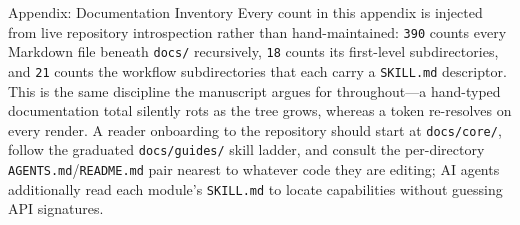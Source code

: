 \documentclass[
  ignorenonframetext,
]{beamer}
\begin{document}
\begin{frame}{Appendix: Documentation
Inventory}
Every count in this appendix is injected from live repository
introspection rather than hand-maintained: \texttt{390} counts every
Markdown file beneath \texttt{docs/} recursively, \texttt{18} counts its
first-level subdirectories, and \texttt{21} counts the workflow
subdirectories that each carry a \texttt{SKILL.md} descriptor. This is
the same discipline the manuscript argues for throughout---a hand-typed
documentation total silently rots as the tree grows, whereas a token
re-resolves on every render. A reader onboarding to the repository
should start at \texttt{docs/core/}, follow the graduated
\texttt{docs/guides/} skill ladder, and consult the per-directory
\texttt{AGENTS.md}/\texttt{README.md} pair nearest to whatever code they
are editing; AI agents additionally read each module's \texttt{SKILL.md}
to locate capabilities without guessing API signatures.
\end{frame}
\end{document}
